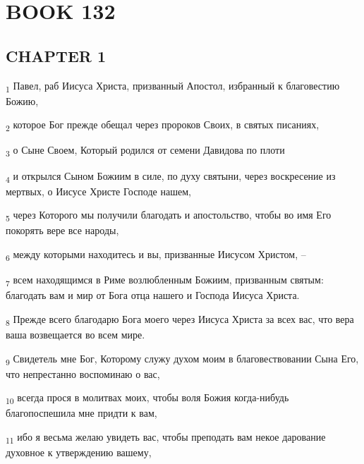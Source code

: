 \section{BOOK 132}
\subsection{CHAPTER 1}
\begin{tcolorbox}
\textsubscript{1} Павел, раб Иисуса Христа, призванный Апостол, избранный к благовестию Божию,
\end{tcolorbox}
\begin{tcolorbox}
\textsubscript{2} которое Бог прежде обещал через пророков Своих, в святых писаниях,
\end{tcolorbox}
\begin{tcolorbox}
\textsubscript{3} о Сыне Своем, Который родился от семени Давидова по плоти
\end{tcolorbox}
\begin{tcolorbox}
\textsubscript{4} и открылся Сыном Божиим в силе, по духу святыни, через воскресение из мертвых, о Иисусе Христе Господе нашем,
\end{tcolorbox}
\begin{tcolorbox}
\textsubscript{5} через Которого мы получили благодать и апостольство, чтобы во имя Его покорять вере все народы,
\end{tcolorbox}
\begin{tcolorbox}
\textsubscript{6} между которыми находитесь и вы, призванные Иисусом Христом, --
\end{tcolorbox}
\begin{tcolorbox}
\textsubscript{7} всем находящимся в Риме возлюбленным Божиим, призванным святым: благодать вам и мир от Бога отца нашего и Господа Иисуса Христа.
\end{tcolorbox}
\begin{tcolorbox}
\textsubscript{8} Прежде всего благодарю Бога моего через Иисуса Христа за всех вас, что вера ваша возвещается во всем мире.
\end{tcolorbox}
\begin{tcolorbox}
\textsubscript{9} Свидетель мне Бог, Которому служу духом моим в благовествовании Сына Его, что непрестанно воспоминаю о вас,
\end{tcolorbox}
\begin{tcolorbox}
\textsubscript{10} всегда прося в молитвах моих, чтобы воля Божия когда-нибудь благопоспешила мне придти к вам,
\end{tcolorbox}
\begin{tcolorbox}
\textsubscript{11} ибо я весьма желаю увидеть вас, чтобы преподать вам некое дарование духовное к утверждению вашему,
\end{tcolorbox}
